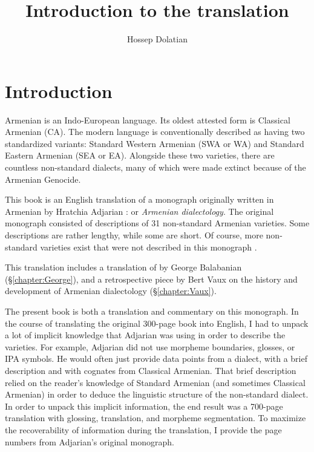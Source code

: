\documentclass[output=paper]{langscibook}
\title{Introduction to the translation}
\author{Hossep Dolatian\affiliation{Stony Brook University}}
\begin{document}
\maketitle
\label{chapter:HossepIntro}

\section{Introduction}

Armenian is an Indo-European language. Its oldest attested form is Classical Armenian (CA). The modern language is conventionally described as having two standardized variants: Standard Western Armenian (SWA or WA) and Standard Eastern Armenian (SEA or EA). Alongside these two varieties, there are countless non-standard dialects, many of which were made extinct because of the Armenian Genocide. 

This book is an English translation of a monograph originally written in Armenian by Hratchia Adjarian \citep{Adjarian-1911-DialectologyBook}:    or \textit{Armenian dialectology}. The original monograph consisted of descriptions of 31 non-standard Armenian varieties. Some descriptions are rather lengthy, while some are short.  Of course, more non-standard varieties exist that were not described in this monograph  \citep{GreppinKhachaturian-1986-HandbookArmenianDialectology,Martirosyan-2019-Armeniandialects,Martirosyan-2019-ArmenianDialectsBigVersionRussianJournal,DolatianEtAl-prep-IranianGrammar}.

This translation  includes a translation of \citet{Adjarian-1899-ArmenianExplosives} by George Balabanian (\S\ref{chapter:George}), and a retrospective piece by Bert Vaux on the history and development of Armenian dialectology (\S\ref{chapter:Vaux}). 


The present book is both a translation and commentary on this monograph. In the course of translating the original 300-page book into English, I had to unpack a lot of implicit knowledge that Adjarian was using in order to describe the varieties. For example, Adjarian did not use morpheme boundaries, glosses, or IPA symbols. He would often just provide data points from a dialect, with a brief  description and with cognates from Classical Armenian. That brief description relied on the reader's knowledge of Standard Armenian (and sometimes Classical Armenian) in order to deduce the linguistic structure of the non-standard dialect. In order to unpack this implicit information, the end result was a 700-page translation with glossing, translation, and morpheme segmentation. To maximize the recoverability of information during the translation, I provide the page numbers from Adjarian's original monograph. 
\end{document}
